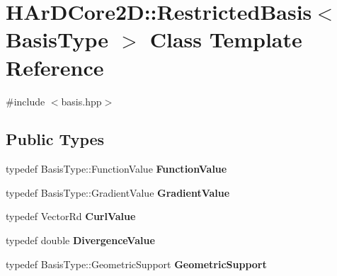 \hypertarget{classHArDCore2D_1_1RestrictedBasis}{}\section{H\+Ar\+D\+Core2D\+:\+:Restricted\+Basis$<$ Basis\+Type $>$ Class Template Reference}
\label{classHArDCore2D_1_1RestrictedBasis}


{\ttfamily \#include $<$basis.\+hpp$>$}

\subsection*{Public Types}
\begin{DoxyCompactItemize}
\item 
\mbox{\label{classHArDCore2D_1_1RestrictedBasis_a5772db07ac87c68788744dc652317540}} 
typedef Basis\+Type\+::\+Function\+Value {\bfseries Function\+Value}
\item 
\mbox{\label{classHArDCore2D_1_1RestrictedBasis_a2fd05335aff5beae7d23d274ccf95496}} 
typedef Basis\+Type\+::\+Gradient\+Value {\bfseries Gradient\+Value}
\item 
\mbox{\label{classHArDCore2D_1_1RestrictedBasis_a76c22157064e9c58e0e45c3dfcfc8e19}} 
typedef Vector\+Rd {\bfseries Curl\+Value}
\item 
\mbox{\label{classHArDCore2D_1_1RestrictedBasis_a841d7df7cd3379bd3f774206dd1009d1}} 
typedef double {\bfseries Divergence\+Value}
\item 
\mbox{\label{classHArDCore2D_1_1RestrictedBasis_ac1568c98b6dcfe1198d237669218e85c}} 
typedef Basis\+Type\+::\+Geometric\+Support {\bfseries Geometric\+Support}
\end{DoxyCompactItemize}

